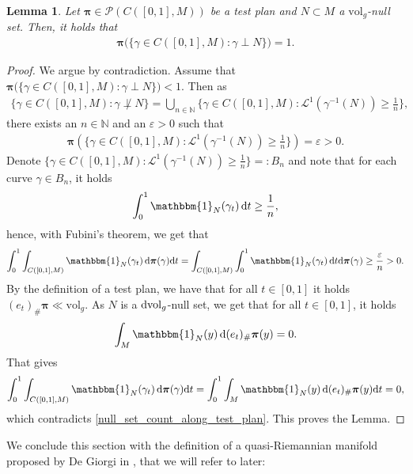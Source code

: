 \documentclass[a4paper,10pt]{article}
\newtheorem{lemma}[theorem]{Lemma}
\numberwithin{equation}{section}
\newcommand{\N}{\mathbb{N}}
\newcommand{\e}{\varepsilon}
\newcommand{\vol}{\mathrm{vol}}
\newcommand{\di}{{\rm d}}
\begin{document}
 \begin{lemma}\label{testplans_on_transversal}
     Let $\boldsymbol{\pi}\in \mathcal{P}(C([0,1], M))$ be a test plan and $N\subset M$ a $\vol_g$-null set. Then, it holds that 
     \begin{align}
         \boldsymbol{\pi}\Big(\{\gamma \in C([0,1], M): \gamma \perp N \}\Big)=1.
     \end{align}
 \end{lemma}
 \begin{proof}
     We argue by contradiction. Assume that $\boldsymbol{\pi}\Big(\{\gamma \in C([0,1], M): \gamma \perp N \}\Big)<1$. 
     Then as 
     \begin{align*}
         \{\gamma \in C([0,1], M): \gamma \not \perp N \}= \bigcup_{n \in \N} \{\gamma \in C([0,1], M): \mathcal{L}^1(\gamma^{-1}(N)) \geq \frac{1}{n}\},
     \end{align*}
     there exists an $n \in \N$ and an $\e>0$ such that
     \begin{align}
       \boldsymbol{\pi} (\{\gamma \in C([0,1], M): \mathcal{L}^1(\gamma^{-1}(N)) \geq \frac{1}{n}\}) =\e >0.
     \end{align}
     Denote $\{\gamma \in C([0,1], M): \mathcal{L}^1(\gamma^{-1}(N)) \geq \frac{1}{n}\}=:B_n$ and note that for each curve $\gamma \in B_n$, it holds
     \begin{align}\label{null_set_count_along_bad_curve}
         \int_0^1 \mathbbm{1}_{N}(\gamma_t)\,\di t \geq \frac{1}{n},
     \end{align}
     hence, with Fubini's theorem, we get that 
      \begin{align}\label{null_set_count_along_test_plan}
         \int_0^1 \int_{C([0,1], M)} \mathbbm{1}_{N}(\gamma_t)\,\di\boldsymbol{\pi}(\gamma)\di t =  \int_{C([0,1], M)} \int_0^1 \mathbbm{1}_{N}(\gamma_t)\,\di t\di\boldsymbol{\pi}(\gamma) \geq \frac{\e}{n}>0.
     \end{align}
     By the definition of a test plan, we have that for all $t\in [0,1]$ it holds $(e_t)_\#\boldsymbol{\pi} \ll \vol_g$.
     As $N$ is a $\di\vol_g$-null set, we get that for all $t\in [0,1]$, it holds
     \begin{align*}
         \int_{M} \mathbbm{1}_{N}(y)\, \di (e_t)_\#\boldsymbol{\pi}(y) =0.
     \end{align*}
     That gives
     \begin{align*}
          \int_0^1 \int_{C([0,1], M)} \mathbbm{1}_{N}(\gamma_t)\,\di\boldsymbol{\pi}(\gamma)\di t = \int_0^1 \int_M \mathbbm{1}_{N}(y)\,\di(e_t)_\#\boldsymbol{\pi}(y)\di t =0,
     \end{align*}
     which contradicts \eqref{null_set_count_along_test_plan}. This proves the Lemma.
 \end{proof}
We conclude this section with the definition of a quasi-Riemannian manifold proposed by De Giorgi in \cite{de1990conversazioni}, that we will refer to later:
\smallskip
\end{document}

